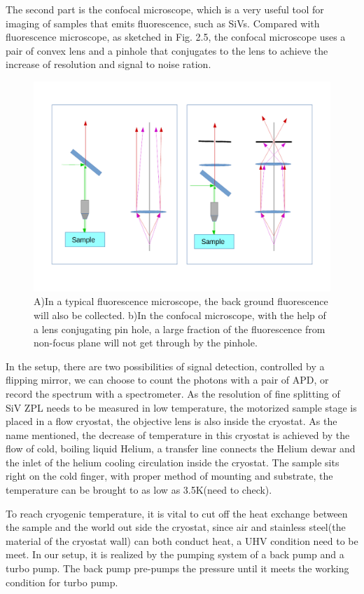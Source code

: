 The second part is the confocal microscope, which is a very useful tool for imaging of samples that emits fluorescence, such as SiVs. Compared with fluorescence microscope, as sketched in Fig. 2.5, the confocal microscope uses a pair of convex lens and a pinhole that conjugates to the lens to achieve the increase of resolution and signal to noise ration.
\begin{figure}[h]
	\centering
	\includegraphics[width=1\linewidth]{Figures/pic/microscope}
	\caption{A)In a typical fluorescence microscope, the back ground fluorescence will also be collected. b)In the confocal microscope, with the help of a lens conjugating pin hole, a large fraction of the fluorescence from non-focus plane will not get through by the pinhole.}
	\label{fig:microscope}
\end{figure}
In the setup, there are two possibilities of signal detection, controlled by a flipping mirror, we can choose to count the photons with a pair of APD, or record the spectrum with a spectrometer.
As the resolution of fine splitting of SiV ZPL needs to be measured in low temperature, the motorized sample stage is placed in a flow cryostat, the objective lens is also inside the cryostat. As the name mentioned, the decrease of temperature in this cryostat is achieved by the flow of cold, boiling liquid Helium, a transfer line connects the Helium dewar and the inlet of the helium cooling circulation inside the cryostat. The sample sits right on the cold finger, with proper method of mounting and substrate, the temperature can be brought to as low as 3.5K(need to check).

To reach cryogenic temperature, it is vital to cut off the heat exchange between the sample and the world out side the cryostat, since air and stainless steel(the material of the cryostat wall) can both conduct heat, a UHV condition need to be meet. In our setup, it is realized by the pumping system of a back pump and a turbo pump. The back pump pre-pumps the pressure until it meets the working condition for turbo pump.


